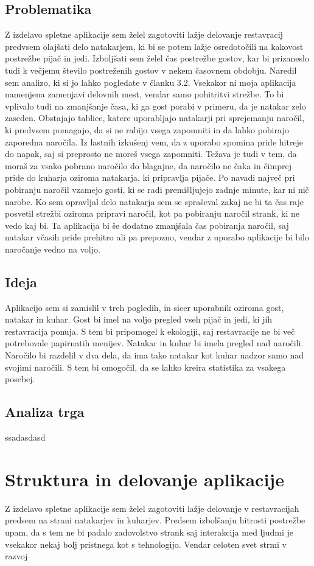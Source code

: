 \documentclass[a4paper, 12pt]{book}
\begin{document}
\section {Problematika}
Z izdelavo spletne aplikacije sem želel zagotoviti lažje delovanje restavracij predvsem olajšati delo natakarjem, ki bi se potem lažje osredotočili na kakovost postrežbe pijač in jedi. Izboljšati sem želel čas postrežbe gostov, kar bi prizaneslo tudi k večjemu število postreženih gostov v nekem časovnem obdobju. Naredil sem analizo, ki si jo lahko pogledate v članku 3.2. Vsekakor ni moja aplikacija namenjena zamenjavi delovnih mest, vendar samo pohitritvi strežbe. To bi vplivalo tudi na zmanjšanje časa, ki ga gost porabi v primeru, da je natakar zelo zaseden. Obstajajo tablice, katere uporabljajo natakarji pri sprejemanju naročil, ki predvsem pomagajo, da si ne rabijo vsega zapomniti in da lahko pobirajo zaporedna naročila. Iz lastnih izkušenj vem, da z uporabo spomina pride hitreje do napak, saj si preprosto ne moreš vsega zapomniti. Težava je tudi v tem, da moraš za vsako pobrano naročilo do blagajne, da naročilo ne čaka in čimprej pride do kuharja oziroma natakarja, ki pripravlja pijače. Po navadi največ pri pobiranju naročil vzamejo  gosti, ki se radi premišljujejo zadnje minute, kar ni nič narobe. Ko sem opravljal delo natakarja sem se spraševal zakaj ne bi ta čas raje posvetil strežbi oziroma pripravi naročil, kot pa pobiranju naročil strank, ki ne vedo kaj bi. Ta aplikacija bi še dodatno zmanjšala čas pobiranja naročil, saj natakar včasih pride prehitro ali pa prepozno, vendar z uporabo aplikacije bi bilo naročanje vedno na voljo. 

\section {Ideja}
Aplikacijo sem si zamislil v treh pogledih, in sicer uporabnik oziroma gost, natakar in kuhar. Gost bi imel na voljo pregled vseh pijač in jedi, ki jih restavracija ponuja. S tem bi pripomogel k ekologiji, saj restavracije ne bi več potrebovale papirnatih menijev. Natakar in kuhar bi imela pregled nad naročili. Naročilo bi razdelil v dva dela, da ima tako natakar kot kuhar nadzor samo nad svojimi naročili. S tem bi omogočil, da se lahko kreira statistika za vsakega posebej.


\section {Analiza trga}
ssadasdasd

\chapter {Struktura in delovanje aplikacije}
Z izdelavo spletne aplikacije sem želel zagotoviti lažje delovanje v restavracijah predsem na strani natakarjev in kuharjev. Predsem izbolšanju hitrosti postrežbe upam, da s tem ne bi padalo zadovolstvo strank saj interakcija med ljudmi je vsekakor nekaj bolj pristnega kot s tehnologijo. Vendar celoten svet strmi v razvoj 
\newpage %
\ \\
\clearpage
{}


\end{document}
